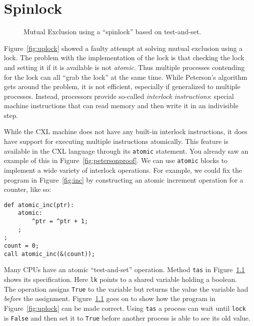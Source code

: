 \documentclass{report}
\newenvironment{code}{
\tcolorbox
}{
\endtcolorbox
}
\begin{document}
\chapter{Spinlock}

\begin{figure}
\begin{code}

\end{code}
\caption{Mutual Exclusion using a ``spinlock'' based on test-and-set.}
\label{fig:tas}
\end{figure}

Figure~\ref{fig:uplock} showed a faulty attempt at solving mutual
exclusion using a lock.  The problem with the implementation of the
lock is that checking the lock and setting it if it is available is
not \emph{atomic}.  Thus multiple processes contending for the lock
can all ``grab the lock'' at the same time.  While Peterson's
algorithm gets around the problem, it is not efficient, especially
if generalized to multiple processes.  Instead, processors provide
so-called \emph{interlock instructions}: special machine instructions
that can read memory and then write it in an indivisible step.

While the CXL machine does not have any built-in interlock instructions,
it does have support for executing multiple instructions atomically.
This feature is available in the CXL language through its \texttt{atomic}
statement.
You already saw an example of this in Figure~\ref{fig:petersonproof}.
We can use \texttt{atomic} blocks to implement a wide variety of
interlock operations.
For example, we could fix the program in Figure~\ref{fig:inc} by
constructing an atomic increment operation for a counter, like so:
\begin{code}
\begin{verbatim}
def atomic_inc(ptr):
    atomic:
        ^ptr = ^ptr + 1;
    ;
;
count = 0;
call atomic_inc(&(count));
\end{verbatim}
\end{code}

Many CPUs have an atomic ``test-and-set'' operation.
Method \texttt{tas} in Figure~\ref{fig:tas} shows its specification.
Here \texttt{lk} points to a shared variable holding a
boolean.  The operation assigns \texttt{True} to the
variable but returns the value the variable had \emph{before}
the assignment.
Figure~\ref{fig:tas} goes on to show how the program
in Figure~\ref{fig:uplock} can be made correct.
Using \texttt{tas} a process can wait until \texttt{lock} is
\texttt{False} and then set it to \texttt{True} before another
process is able to see its old value.
\end{document}
